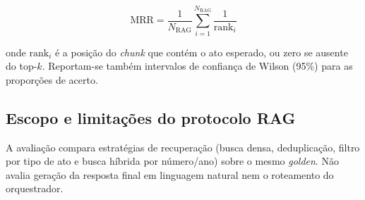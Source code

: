 \begin{equation}
\text{MRR} = \frac{1}{N_{\text{RAG}}} \sum_{i=1}^{N_{\text{RAG}}} \frac{1}{\text{rank}_i}
\end{equation}

onde $\text{rank}_i$ é a posição do \textit{chunk} que contém o ato esperado, ou zero se ausente do top-$k$. Reportam-se também intervalos de confiança de Wilson (95\%) \cite{Agresti1998} para as proporções de acerto.

\subsection{Escopo e limitações do protocolo RAG}

A avaliação compara estratégias de recuperação (busca densa, deduplicação, filtro por tipo de ato e busca híbrida por número/ano) sobre o mesmo \textit{golden}. Não avalia geração da resposta final em linguagem natural nem o roteamento do orquestrador.
